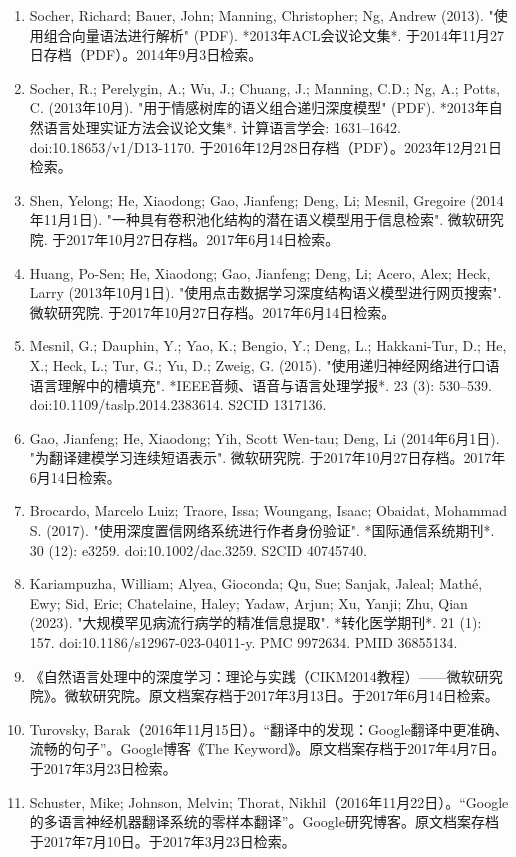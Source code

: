 \begin{enumerate}
\item Socher, Richard; Bauer, John; Manning, Christopher; Ng, Andrew (2013). "使用组合向量语法进行解析" (PDF). *2013年ACL会议论文集*. 于2014年11月27日存档（PDF）。2014年9月3日检索。
\item Socher, R.; Perelygin, A.; Wu, J.; Chuang, J.; Manning, C.D.; Ng, A.; Potts, C. (2013年10月). "用于情感树库的语义组合递归深度模型" (PDF). *2013年自然语言处理实证方法会议论文集*. 计算语言学会: 1631–1642. doi:10.18653/v1/D13-1170. 于2016年12月28日存档（PDF）。2023年12月21日检索。
\item Shen, Yelong; He, Xiaodong; Gao, Jianfeng; Deng, Li; Mesnil, Gregoire (2014年11月1日). "一种具有卷积池化结构的潜在语义模型用于信息检索". 微软研究院. 于2017年10月27日存档。2017年6月14日检索。
\item Huang, Po-Sen; He, Xiaodong; Gao, Jianfeng; Deng, Li; Acero, Alex; Heck, Larry (2013年10月1日). "使用点击数据学习深度结构语义模型进行网页搜索". 微软研究院. 于2017年10月27日存档。2017年6月14日检索。
\item Mesnil, G.; Dauphin, Y.; Yao, K.; Bengio, Y.; Deng, L.; Hakkani-Tur, D.; He, X.; Heck, L.; Tur, G.; Yu, D.; Zweig, G. (2015). "使用递归神经网络进行口语语言理解中的槽填充". *IEEE音频、语音与语言处理学报*. 23 (3): 530–539. doi:10.1109/taslp.2014.2383614. S2CID 1317136.
\item Gao, Jianfeng; He, Xiaodong; Yih, Scott Wen-tau; Deng, Li (2014年6月1日). "为翻译建模学习连续短语表示". 微软研究院. 于2017年10月27日存档。2017年6月14日检索。
\item Brocardo, Marcelo Luiz; Traore, Issa; Woungang, Isaac; Obaidat, Mohammad S. (2017). "使用深度置信网络系统进行作者身份验证". *国际通信系统期刊*. 30 (12): e3259. doi:10.1002/dac.3259. S2CID 40745740.
\item Kariampuzha, William; Alyea, Gioconda; Qu, Sue; Sanjak, Jaleal; Mathé, Ewy; Sid, Eric; Chatelaine, Haley; Yadaw, Arjun; Xu, Yanji; Zhu, Qian (2023). "大规模罕见病流行病学的精准信息提取". *转化医学期刊*. 21 (1): 157. doi:10.1186/s12967-023-04011-y. PMC 9972634. PMID 36855134.
\item 《自然语言处理中的深度学习：理论与实践（CIKM2014教程）——微软研究院》。微软研究院。原文档案存档于2017年3月13日。于2017年6月14日检索。
\item Turovsky, Barak（2016年11月15日）。“翻译中的发现：Google翻译中更准确、流畅的句子”。Google博客《The Keyword》。原文档案存档于2017年4月7日。于2017年3月23日检索。
\item Schuster, Mike; Johnson, Melvin; Thorat, Nikhil（2016年11月22日）。“Google的多语言神经机器翻译系统的零样本翻译”。Google研究博客。原文档案存档于2017年7月10日。于2017年3月23日检索。

\end{enumerate}
